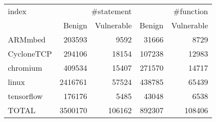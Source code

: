 \begin{tabular}{lrrrr}
\toprule
index & \multicolumn{2}{r}{#statement} & \multicolumn{2}{r}{#function} \\
 & Benign & Vulnerable & Benign & Vulnerable \\
\midrule
ARMmbed & 203593 & 9592 & 31666 & 8729 \\
CycloneTCP & 294106 & 18154 & 107238 & 12983 \\
chromium & 409534 & 15407 & 271570 & 14717 \\
linux & 2416761 & 57524 & 438785 & 65439 \\
tensorflow & 176176 & 5485 & 43048 & 6538 \\
TOTAL & 3500170 & 106162 & 892307 & 108406 \\
\bottomrule
\end{tabular}
